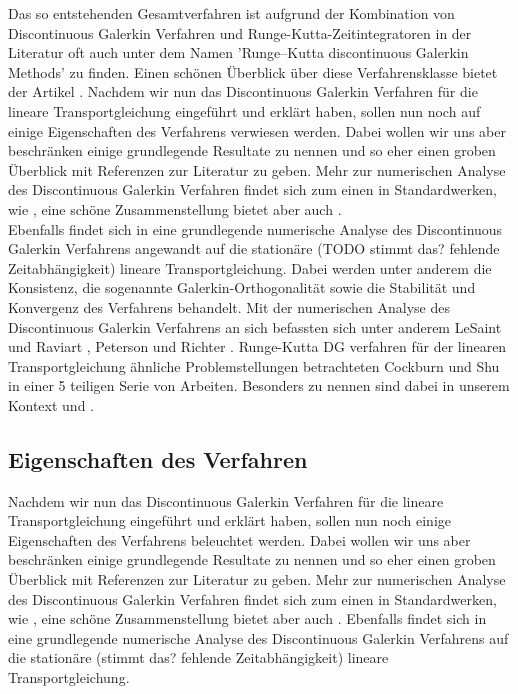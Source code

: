 Das so entstehenden Gesamtverfahren ist aufgrund der Kombination von Discontinuous Galerkin Verfahren und Runge-Kutta-Zeitintegratoren in der Literatur oft auch unter dem Namen 'Runge–Kutta discontinuous Galerkin Methods' zu finden. Einen schönen Überblick über diese Verfahrensklasse bietet der Artikel \cite{cockburn2001runge}.
Nachdem wir nun das Discontinuous Galerkin Verfahren für die lineare Transportgleichung eingeführt und erklärt haben, sollen nun noch auf einige Eigenschaften des Verfahrens verwiesen werden. Dabei wollen wir uns aber beschränken einige grundlegende Resultate zu nennen und so eher einen groben Überblick mit Referenzen zur Literatur zu geben. Mehr zur numerischen Analyse des Discontinuous Galerkin Verfahren findet sich zum einen in Standardwerken, wie \cite{ern2004theory}, eine schöne Zusammenstellung bietet aber auch
\cite{Har08b}. \\
Ebenfalls findet sich in \cite{Har08b} eine grundlegende numerische Analyse des Discontinuous Galerkin Verfahrens angewandt auf die stationäre (TODO stimmt das? fehlende Zeitabhängigkeit) lineare Transportgleichung. Dabei werden unter anderem die Konsistenz, die sogenannte Galerkin-Orthogonalität sowie die Stabilität und Konvergenz des Verfahrens behandelt.
Mit der numerischen Analyse des Discontinuous Galerkin Verfahrens an sich befassten sich unter anderem LeSaint und Raviart \cite{lesaint1974finite}, Peterson \cite{peterson1991note} und Richter \cite{richter1988optimal}.
Runge-Kutta DG verfahren für der linearen Transportgleichung ähnliche Problemstellungen betrachteten Cockburn und Shu in einer 5 teiligen Serie von Arbeiten. Besonders zu nennen sind dabei in unserem Kontext \cite{cockburn1989tvb} und \cite{cockburn1990runge}.


\subsection{Eigenschaften des Verfahren}
Nachdem wir nun das Discontinuous Galerkin Verfahren für die lineare Transportgleichung eingeführt und erklärt haben, sollen nun noch einige Eigenschaften des Verfahrens beleuchtet werden. Dabei wollen wir uns aber beschränken einige grundlegende Resultate zu nennen und so eher einen groben Überblick mit Referenzen zur Literatur zu geben. Mehr zur numerischen Analyse des Discontinuous Galerkin Verfahren findet sich zum einen in Standardwerken, wie \cite{ern2004theory}, eine schöne Zusammenstellung bietet aber auch \cite{Har08b}.
Ebenfalls findet sich in \cite{Har08b} eine grundlegende numerische Analyse des Discontinuous Galerkin Verfahrens auf die stationäre (stimmt das? fehlende Zeitabhängigkeit) lineare Transportgleichung.


